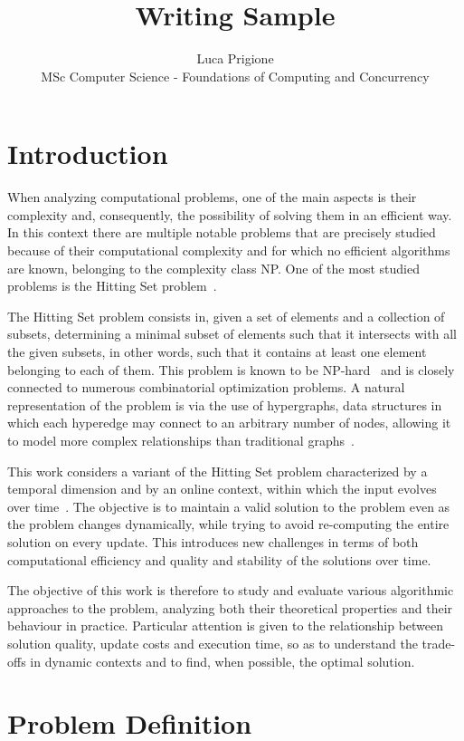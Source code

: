 \documentclass[11pt]{article}
\title{Writing Sample}
\author{Luca Prigione\\
MSc Computer Science - Foundations of Computing and Concurrency}
\date{}
\begin{document}
\maketitle

\section{Introduction}

When analyzing computational problems, one of the main aspects is their complexity and, consequently, the possibility of solving them in an efficient way. In this context there are multiple notable problems that are precisely studied because of their computational complexity and for which no efficient algorithms are known, belonging to the complexity class NP. One of the most studied problems is the Hitting Set problem~\cite{vazirani2001}.

The Hitting Set problem consists in, given a set of elements and a collection of subsets, determining a minimal subset of elements such that it intersects with all the given subsets, in other words, such that it contains at least one element belonging to each of them. This problem is known to be NP-hard~\cite{karp1972} and is closely connected to numerous combinatorial optimization problems. A natural representation of the problem is via the use of hypergraphs, data structures in which each hyperedge may connect to an arbitrary number of nodes, allowing it to model more complex relationships than traditional graphs~\cite{berge1984}.

This work considers a variant of the Hitting Set problem characterized by a temporal dimension and by an online context, within which the input evolves over time~\cite{borodin1998}. The objective is to maintain a valid solution to the problem even as the problem changes dynamically, while trying to avoid re-computing the entire solution on every update. This introduces new challenges in terms of both computational efficiency and quality and stability of the solutions over time.

The objective of this work is therefore to study and evaluate various algorithmic approaches to the problem, analyzing both their theoretical properties and their behaviour in practice. Particular attention is given to the relationship between solution quality, update costs and execution time, so as to understand the trade-offs in dynamic contexts and to find, when possible, the optimal solution.

\section{Problem Definition}
\end{document}
